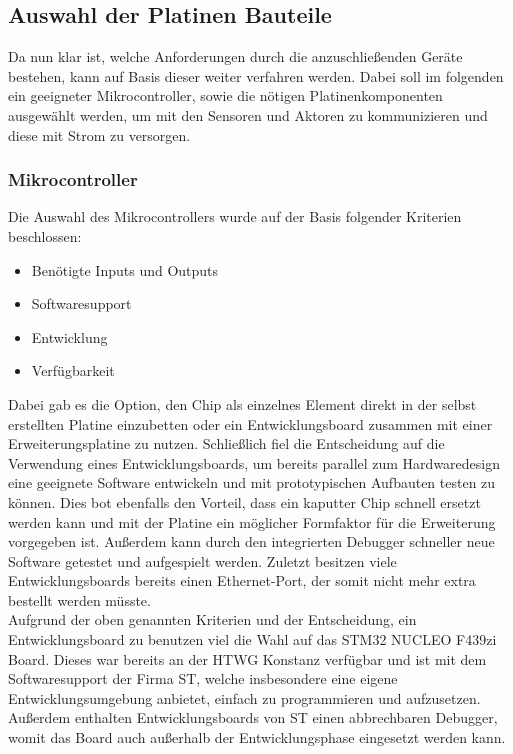 \subsection{Auswahl der Platinen Bauteile}
Da nun klar ist, welche Anforderungen durch die anzuschließenden Geräte bestehen, kann auf Basis dieser weiter verfahren werden. Dabei soll im folgenden ein geeigneter Mikrocontroller, sowie die nötigen Platinenkomponenten ausgewählt werden, um mit den Sensoren und Aktoren zu kommunizieren und diese mit Strom zu versorgen.
\subsubsection{Mikrocontroller}
Die Auswahl des Mikrocontrollers wurde auf der Basis folgender Kriterien beschlossen:
\begin{itemize}
	\item Benötigte Inputs und Outputs
	\item Softwaresupport 
	\item Entwicklung
	\item Verfügbarkeit
\end{itemize}
Dabei gab es die Option, den Chip als einzelnes Element direkt in der selbst erstellten Platine einzubetten oder ein Entwicklungsboard zusammen mit einer Erweiterungsplatine zu nutzen. Schließlich fiel die Entscheidung auf die Verwendung eines Entwicklungsboards, um bereits parallel zum Hardwaredesign eine geeignete Software entwickeln und mit prototypischen Aufbauten testen zu können. Dies bot ebenfalls den Vorteil, dass ein kaputter Chip schnell ersetzt werden kann und mit der Platine ein möglicher Formfaktor für die Erweiterung vorgegeben ist. Außerdem kann durch den integrierten Debugger schneller neue Software getestet und aufgespielt werden. Zuletzt besitzen viele Entwicklungsboards bereits einen Ethernet-Port, der somit nicht mehr extra bestellt werden müsste.\\

\noindent Aufgrund der oben genannten Kriterien und der Entscheidung, ein Entwicklungsboard zu benutzen viel die Wahl auf das STM32 NUCLEO F439zi Board. Dieses war bereits an der HTWG Konstanz verfügbar und ist mit dem Softwaresupport der Firma ST, welche insbesondere eine eigene Entwicklungsumgebung anbietet, einfach zu programmieren und aufzusetzen. Außerdem enthalten Entwicklungsboards von ST einen abbrechbaren Debugger, womit das Board auch außerhalb der Entwicklungsphase eingesetzt werden kann.
